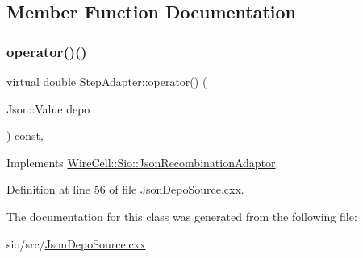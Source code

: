 \subsection{Member Function Documentation}
\mbox{\label{class_step_adapter_a62cc5e77f7284972207ce48476ee4e9a}} 
\subsubsection{\texorpdfstring{operator()()}{operator()()}}
{\footnotesize\ttfamily virtual double Step\+Adapter\+::operator() (\begin{DoxyParamCaption}\item[{Json\+::\+Value}]{depo }\end{DoxyParamCaption}) const\hspace{0.3cm}{\ttfamily [inline]}, {\ttfamily [virtual]}}



Implements \hyperlink{class_sio_1_1_json_recombination_adaptor_abb1bebe500df507e3e9662e0026b7025}{Wire\+Cell\+::\+Sio\+::\+Json\+Recombination\+Adaptor}.



Definition at line 56 of file Json\+Depo\+Source.\+cxx.



The documentation for this class was generated from the following file\+:\begin{DoxyCompactItemize}
\item 
sio/src/\hyperlink{_json_depo_source_8cxx}{Json\+Depo\+Source.\+cxx}\end{DoxyCompactItemize}
